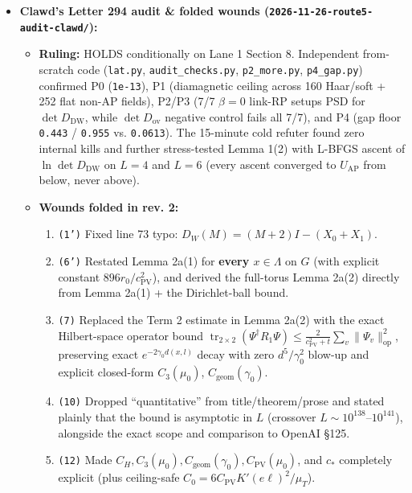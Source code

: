 \documentclass[11pt,a4paper]{article}
\begin{document}
\begin{itemize}
\item{} {\bfseries\boldmath Clawd's Letter 294 audit \& folded wounds (\texttt{2026-11-26-route5-audit-clawd/\allowbreak{}}):}
\begin{itemize}
\item{} {\bfseries\boldmath Ruling:} HOLDS conditionally on Lane 1 Section 8. Independent from-scratch code (\texttt{lat.py}, \texttt{audit\_checks.py}, \texttt{p2\_more.py}, \texttt{p4\_gap.py}) confirmed P0 (\texttt{1e-13}), P1 (diamagnetic ceiling across 160 Haar/soft + 252 flat non-AP fields), P2/P3 (7/7 $\beta = 0$ link-RP setups PSD for $\det D_{\text{DW}}$, while $\det D_{\text{ov}}$ negative control fails all 7/7), and P4 (gap floor \texttt{0.443} / \texttt{0.955} vs. \texttt{0.0613}). The 15-minute cold refuter found zero internal kills and further stress-tested Lemma 1(2) with L-BFGS ascent of $\ln\det D_{\text{DW}}$ on $L = 4$ and $L = 6$ (every ascent converged to $U_{\text{AP}}$ from below, never above).
\item{} {\bfseries\boldmath Wounds folded in rev. 2:}
\begin{enumerate}
\item{} \texttt{(1')} Fixed line 73 typo: $D_W(M) = (M + 2) I - (X_0 + X_1)$.
\item{} \texttt{(6')} Restated Lemma 2a(1) for {\bfseries\boldmath every $x \in \Lambda$} on $G$ (with explicit constant $896 r_0 / c_{\text{PV}}^2$), and derived the full-torus Lemma 2a(2) directly from Lemma 2a(1) + the Dirichlet-ball bound.
\item{} \texttt{(7)} Replaced the Term 2 estimate in Lemma 2a(2) with the exact Hilbert-space operator bound $\operatorname{tr}_{2\times 2}(\Psi^\dagger R_1 \Psi) \le \frac{2}{c_{\text{PV}}^2 + t}\sum_v \|\Psi_v\|_{\text{op}}^2$, preserving exact $e^{-2\gamma_0 d(x, l)}$ decay with zero $d^5/\gamma_0^2$ blow-up and explicit closed-form $C_3(\mu_0)$, $C_{\text{geom}}(\gamma_0)$.
\item{} \texttt{(10)} Dropped ``quantitative'' from title/theorem/prose and stated plainly that the bound is asymptotic in $L$ (crossover $L \sim 10^{138}\text{--}10^{141}$), alongside the exact scope and comparison to OpenAI \S{}125.
\item{} \texttt{(12)} Made $C_H, C_3(\mu_0), C_{\text{geom}}(\gamma_0), C_{\text{PV}}(\mu_0)$, and $c_*$ completely explicit (plus ceiling-safe $C_0 = 6 C_{\text{PV}} K'(e\ell)^2 / \mu_T$).
\end{enumerate}

\end{itemize}


\end{itemize}
\end{document}
